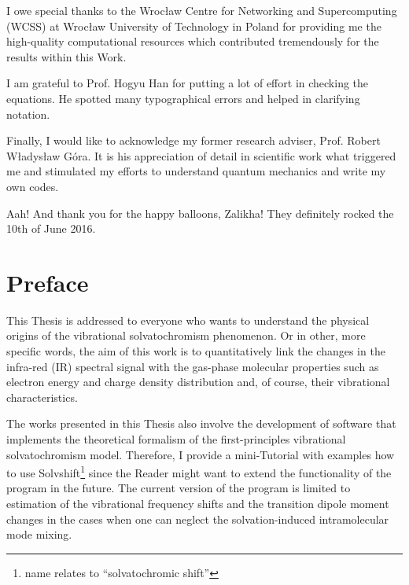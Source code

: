 \documentclass[a4paper,titlepage,twoside,fleqn,12pt]{book}
\begin{document}
{I owe special thanks to the Wroc{\l}aw Centre for Networking and Supercomputing
(WCSS) at Wroc{\l}aw University of Technology in Poland for providing me 
the high\hyp{}quality computational resources which contributed tremendously
for the results within this Work.

I am grateful to Prof. Hogyu Han for putting a lot of effort in checking
the equations. He spotted many typographical errors and helped
in clarifying notation.

Finally, I would like to acknowledge my former research adviser, Prof. Robert W{\l}adys{\l}aw G{\'o}ra.
It is his appreciation of detail in scientific work what triggered me and stimulated
my efforts to understand quantum mechanics and write my own codes.

Aah! And thank you for the happy balloons, Zalikha! They definitely rocked the 10th of June 2016.


}
\chapter{Preface}

This Thesis is addressed to everyone who wants to understand the physical
origins of the vibrational solvatochromism phenomenon. Or in other, more specific words, 
the aim of this work is to quantitatively link the changes in the infra\hyp{}red (IR)
spectral signal with the gas\hyp{}phase molecular properties such as electron energy and charge
density distribution and, of course, their vibrational characteristics. 

The works presented in this Thesis also involve the development of software
that implements the theoretical formalism of the first\hyp{}principles vibrational solvatochromism model.
Therefore, I provide a mini\hyp{}Tutorial with examples how to use {\sc Solvshift}\footnote{name relates to 
``solvatochromic shift''} 
since the Reader might want to extend the functionality of the program in the future.
The current version of the program is limited to estimation of the vibrational frequency 
shifts and the transition dipole moment changes in the cases when one can 
neglect the solvation\hyp{}induced intramolecular mode mixing.
\tableofcontents
\mainmatter
\end{document}
